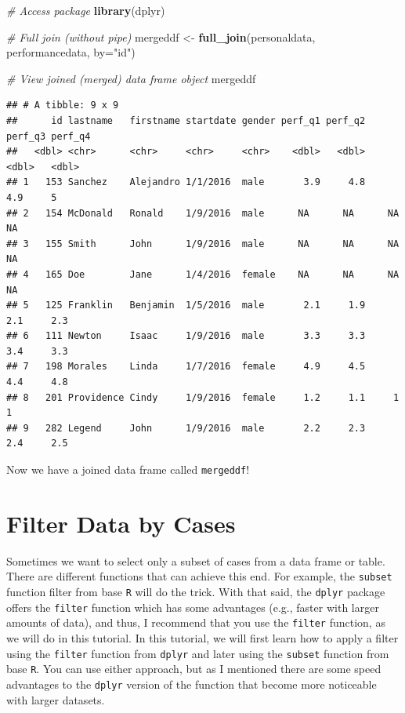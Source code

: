\documentclass[]{book}
\newenvironment{Shaded}{\begin{snugshade}}{\end{snugshade}}
\newcommand{\KeywordTok}[1]{\textcolor[rgb]{0.13,0.29,0.53}{\textbf{#1}}}
\newcommand{\DataTypeTok}[1]{\textcolor[rgb]{0.13,0.29,0.53}{#1}}
\newcommand{\StringTok}[1]{\textcolor[rgb]{0.31,0.60,0.02}{#1}}
\newcommand{\CommentTok}[1]{\textcolor[rgb]{0.56,0.35,0.01}{\textit{#1}}}
\newcommand{\NormalTok}[1]{#1}
\begin{document}
\begin{Shaded}
\begin{Highlighting}[]
\CommentTok{# Access package}
\KeywordTok{library}\NormalTok{(dplyr)}
\end{Highlighting}
\end{Shaded}

\begin{Shaded}
\begin{Highlighting}[]
\CommentTok{# Full join (without pipe)}
\NormalTok{mergeddf <-}\StringTok{ }\KeywordTok{full_join}\NormalTok{(personaldata, performancedata, }\DataTypeTok{by=}\StringTok{"id"}\NormalTok{)}

\CommentTok{# View joined (merged) data frame object}
\NormalTok{mergeddf}
\end{Highlighting}
\end{Shaded}

\begin{verbatim}
## # A tibble: 9 x 9
##      id lastname   firstname startdate gender perf_q1 perf_q2 perf_q3 perf_q4
##   <dbl> <chr>      <chr>     <chr>     <chr>    <dbl>   <dbl>   <dbl>   <dbl>
## 1   153 Sanchez    Alejandro 1/1/2016  male       3.9     4.8     4.9     5  
## 2   154 McDonald   Ronald    1/9/2016  male      NA      NA      NA      NA  
## 3   155 Smith      John      1/9/2016  male      NA      NA      NA      NA  
## 4   165 Doe        Jane      1/4/2016  female    NA      NA      NA      NA  
## 5   125 Franklin   Benjamin  1/5/2016  male       2.1     1.9     2.1     2.3
## 6   111 Newton     Isaac     1/9/2016  male       3.3     3.3     3.4     3.3
## 7   198 Morales    Linda     1/7/2016  female     4.9     4.5     4.4     4.8
## 8   201 Providence Cindy     1/9/2016  female     1.2     1.1     1       1  
## 9   282 Legend     John      1/9/2016  male       2.2     2.3     2.4     2.5
\end{verbatim}

Now we have a joined data frame called \texttt{mergeddf}!

\section{Filter Data by Cases}\label{filter-data-by-cases}

Sometimes we want to select only a subset of cases from a data frame or
table. There are different functions that can achieve this end. For
example, the \texttt{subset} function filter from base \texttt{R} will
do the trick. With that said, the \texttt{dplyr} package offers the
\texttt{filter} function which has some advantages (e.g., faster with
larger amounts of data), and thus, I recommend that you use the
\texttt{filter} function, as we will do in this tutorial. In this
tutorial, we will first learn how to apply a filter using the
\texttt{filter} function from \texttt{dplyr} and later using the
\texttt{subset} function from base \texttt{R}. You can use either
approach, but as I mentioned there are some speed advantages to the
\texttt{dplyr} version of the function that become more noticeable with
larger datasets.
\end{document}
